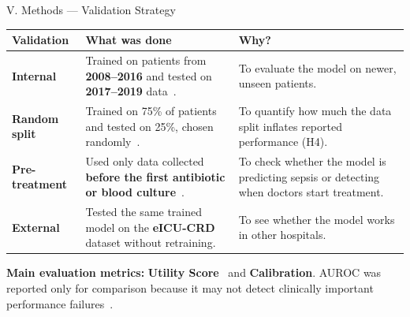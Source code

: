 \documentclass[aspectratio=169,10pt]{beamer}
\newcommand{\tablestyle}{%
  \renewcommand{\arraystretch}{1.2}%
  \small%
}
\begin{document}
\begin{frame}{V. Methods --- Validation Strategy}
\tablestyle
\begin{center}
\begin{tabular}{p{2cm}p{6cm}p{4.5cm}}
\toprule
\textbf{Validation} & \textbf{What was done} & \textbf{Why?} \\
\midrule
\textbf{Internal} & Trained on patients from \textbf{2008--2016} and tested on \textbf{2017--2019} data~\cite{guo2022temporal}. & To evaluate the model on newer, unseen patients. \\[3pt]
\textbf{Random split} & Trained on 75\% of patients and tested on 25\%, chosen randomly~\cite{guo2022temporal}. & To quantify how much the data split inflates reported performance (H4). \\[3pt]
\textbf{Pre-treatment} & Used only data collected \textbf{before the first antibiotic or blood culture}~\cite{kamran2024evaluation}. & To check whether the model is predicting sepsis or detecting when doctors start treatment. \\[3pt]
\textbf{External} & Tested the same trained model on the \textbf{eICU-CRD}~\cite{pollard2018eicu} dataset without retraining. & To see whether the model works in other hospitals. \\
\bottomrule
\end{tabular}
\end{center}

\vspace{4pt}
\textbf{Main evaluation metrics:} \textbf{Utility Score}~\cite{reyna2020utility} and \textbf{Calibration}. AUROC was reported only for comparison because it may not detect clinically important performance failures~\cite{wang2025srpm}.
\end{frame}
\end{document}
